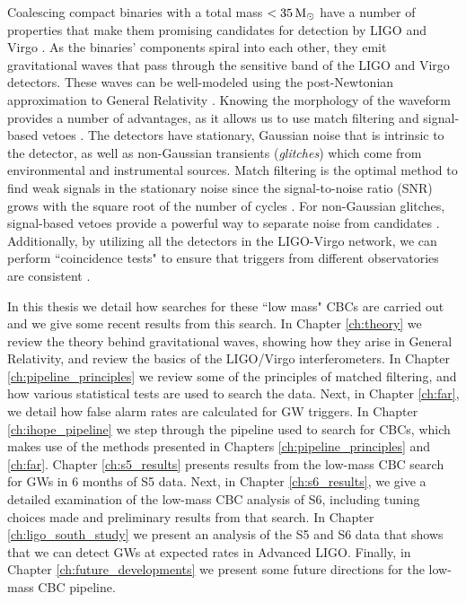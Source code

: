 Coalescing compact binaries with a total mass $< 35\,\mathrm{M_\odot}$ have a number of
properties that make them promising candidates for detection by LIGO and Virgo
\cite{LIGOS1iul,LIGOS2iul,LIGOS2macho,
LIGOS2bbh,LIGOS3S4all,Collaboration:2009tt,Abbott:2009qj,S5LowMassLV}.  As the
binaries' components spiral into each other, they emit gravitational waves that
pass through the sensitive band of the LIGO and Virgo detectors.  These waves
can be well-modeled using the post-Newtonian approximation to General
Relativity \cite{Blanchet:1996pi,Droz:1999qx,Blanchet:2002av,
Buonanno:2006ui,Boyle:2007ft,Hannam:2007ik, pan:024014,Boyle:2009dg}.  Knowing
the morphology of the waveform provides a number of advantages, as it allows us
to use match filtering and signal-based vetoes \cite{Brown,Allen:2004}.  The
detectors have stationary, Gaussian noise that is intrinsic to the detector, as
well as non-Gaussian transients (\emph{glitches}) which come from environmental
and instrumental sources.  Match filtering is the optimal method to find weak
signals in the stationary noise since the signal-to-noise ratio (SNR) grows
with the square root of the number of cycles
\cite{SathyaSchutz:livingReveiw:2009}. For non-Gaussian glitches, signal-based
vetoes provide a powerful way to separate noise from candidates
\cite{Allen:2004,Rodriguez:2007}.  Additionally, by utilizing all the detectors
in the LIGO-Virgo network, we can perform ``coincidence tests" to ensure that
triggers from different observatories are consistent \cite{Robinson:2008}.

In this thesis we detail how searches for these ``low mass" \acp{CBC} are
carried out and we give some recent results from this search. In Chapter
\ref{ch:theory} we review the theory behind gravitational waves, showing how
they arise in General Relativity, and review the basics of the \ac{LIGO}/Virgo
interferometers. In Chapter \ref{ch:pipeline_principles} we review some of the
principles of matched filtering, and how various statistical tests are used to
search the data. Next, in Chapter \ref{ch:far}, we detail how false alarm rates
are calculated for \ac{GW} triggers. In Chapter \ref{ch:ihope_pipeline} we step
through the pipeline used to search for \acp{CBC}, which makes use of the
methods presented in Chapters \ref{ch:pipeline_principles} and \ref{ch:far}.
Chapter \ref{ch:s5_results} presents results from the low-mass \ac{CBC} search
for \acp{GW} in $6$ months of \ac{S5} data. Next, in Chapter
\ref{ch:s6_results}, we give a detailed examination of the low-mass \ac{CBC}
analysis of \ac{S6}, including tuning choices made and preliminary results from
that search. In Chapter \ref{ch:ligo_south_study} we present an analysis of the
\ac{S5} and \ac{S6} data that shows that we can detect \acp{GW} at expected
rates in Advanced \ac{LIGO}. Finally, in Chapter \ref{ch:future_developments}
we present some future directions for the low-mass \ac{CBC} pipeline.
